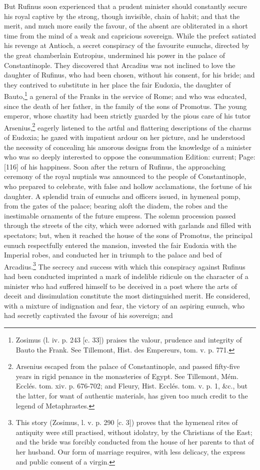 But Rufinus soon experienced that a prudent minister should constantly secure his royal captive by the strong, though invisible, chain of habit; and that the merit, and much more easily the favour, of the absent are obliterated in a short time from the mind of a weak and capricious sovereign. While the prefect satiated his revenge at Antioch, a secret conspiracy of the favourite eunuchs, directed by the great chamberlain Eutropius, undermined his power in the palace of Constantinople. They discovered that Arcadius was not inclined to love the daughter of Rufinus, who had been chosen, without his consent, for his bride; and they contrived to substitute in her place the fair Eudoxia, the daughter of Bauto,\footnote{Zosimus (l. iv. p. 243 [c. 33]) praises the valour, prudence and integrity of Bauto the Frank. See Tillemont, Hist. des Empereurs, tom. v. p. 771.} a general of the Franks in the service of Rome; and who was educated, since the death of her father, in the family of the sons of Promotus. The young emperor, whose chastity had been strictly guarded by the pious care of his tutor Arsenius,\footnote{Arsenius escaped from the palace of Constantinople, and passed fifty-five years in rigid penance in the monasteries of Egypt. See Tillemont, Mém. Ecclés. tom. xiv. p. 676-702; and Fleury, Hist. Ecclés. tom. v. p. 1, \&c., but the latter, for want of authentic materials, has given too much credit to the legend of Metaphrastes.} eagerly listened to the artful and flattering descriptions of the charms of Eudoxia; he gazed with impatient ardour on her picture, and he understood the necessity of concealing his amorous designs from the knowledge of a minister who was so deeply interested to oppose the consummation Edition: current; Page: [116] of his happiness. Soon after the return of Rufinus, the approaching ceremony of the royal nuptials was announced to the people of Constantinople, who prepared to celebrate, with false and hollow acclamations, the fortune of his daughter. A splendid train of eunuchs and officers issued, in hymeneal pomp, from the gates of the palace; bearing aloft the diadem, the robes and the inestimable ornaments of the future empress. The solemn procession passed through the streets of the city, which were adorned with garlands and filled with spectators; but, when it reached the house of the sons of Promotus, the principal eunuch respectfully entered the mansion, invested the fair Eudoxia with the Imperial robes, and conducted her in triumph to the palace and bed of Arcadius.\footnote{This story (Zosimus, l. v. p. 290 [c. 3]) proves that the hymeneal rites of antiquity were still practised, without idolatry, by the Christians of the East; and the bride was forcibly conducted from the house of her parents to that of her husband. Our form of marriage requires, with less delicacy, the express and public consent of a virgin.} The secrecy and success with which this conspiracy against Rufinus had been conducted imprinted a mark of indelible ridicule on the character of a minister who had suffered himself to be deceived in a post where the arts of deceit and dissimulation constitute the most distinguished merit. He considered, with a mixture of indignation and fear, the victory of an aspiring eunuch, who had secretly captivated the favour of his sovereign; and 